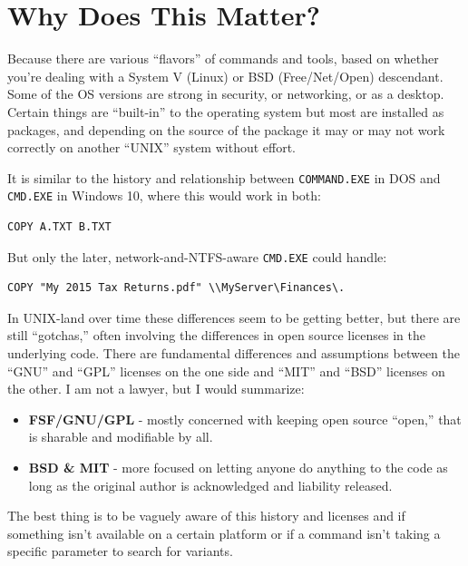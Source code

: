 \documentclass[10pt,]{book}
\numberwithin{figure}{chapter}
\begin{document}
\section{Why Does This Matter?}\label{why-does-this-matter}

Because there are various ``flavors'' of commands and tools, based on
whether you're dealing with a System V (Linux) or BSD (Free/Net/Open)
descendant. Some of the OS versions are strong in security, or
networking, or as a desktop. Certain things are ``built-in'' to the
operating system but most are installed as packages, and depending on
the source of the package it may or may not work correctly on another
``UNIX'' system without effort.

It is similar to the history and relationship between
\texttt{COMMAND.EXE} in DOS and \texttt{CMD.EXE} in Windows 10, where
this would work in both:

\begin{verbatim}
COPY A.TXT B.TXT
\end{verbatim}

But only the later, network-and-NTFS-aware \texttt{CMD.EXE} could
handle:

\begin{verbatim}
COPY "My 2015 Tax Returns.pdf" \\MyServer\Finances\.
\end{verbatim}

In UNIX-land over time these differences seem to be getting better, but
there are still ``gotchas,'' often involving the differences in open
source licenses in the underlying code. There are fundamental
differences and assumptions between the ``GNU'' and ``GPL'' licenses on
the one side and ``MIT'' and ``BSD'' licenses on the other. I am not a
lawyer, but I would summarize:

\begin{itemize}
\item
  \textbf{FSF/GNU/GPL} - mostly concerned with keeping open source
  ``open,'' that is sharable and modifiable by all.
\item
  \textbf{BSD \& MIT} - more focused on letting anyone do anything to
  the code as long as the original author is acknowledged and liability
  released.
\end{itemize}

The best thing is to be vaguely aware of this history and licenses and
if something isn't available on a certain platform or if a command isn't
taking a specific parameter to search for variants.
\end{document}
